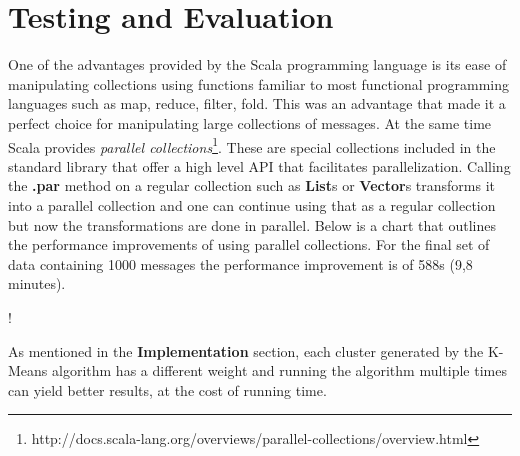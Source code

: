\section{Testing and Evaluation}
\label{sec:testing}

One of the advantages provided by the Scala programming language is its ease of manipulating collections using functions familiar to most functional programming languages such as map, reduce, filter, fold. This was an advantage that made it a perfect choice for manipulating large collections of messages.
At the same time Scala provides \textit{parallel collections}\footnote{http://docs.scala-lang.org/overviews/parallel-collections/overview.html}. These are special collections included in the standard library that offer a high level API that facilitates parallelization. Calling the \textbf{.par} method on a regular collection such as \textbf{List}s or \textbf{Vector}s transforms it into a parallel collection and one can continue using that as a regular collection but now the transformations are done in parallel.
\newline
Below is a chart that outlines the performance improvements of using parallel collections. For the final set of data containing 1000 messages the performance improvement is of 588s (9,8 minutes). 

\resizebox {\columnwidth} {!} {
}

As mentioned in the \textbf{Implementation} section, each cluster generated by the K-Means algorithm has a different weight and running the algorithm multiple times can yield better results, at the cost of running time.

